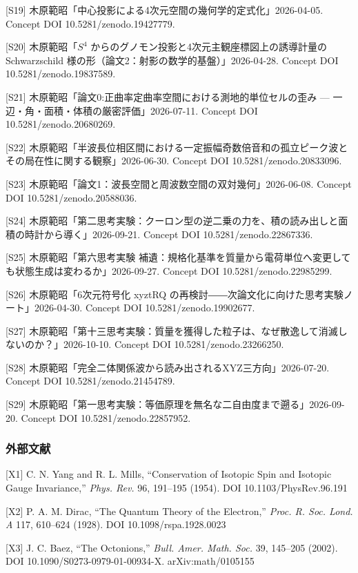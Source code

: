 \documentclass[
  a4paper,
]{ltjsarticle}
\begin{document}
{[}S19{]} 木原範昭「中心投影による4次元空間の幾何学的定式化」2026-04-05.
Concept DOI 10.5281/zenodo.19427779.

{[}S20{]} 木原範昭「\(S^4\)
からのグノモン投影と4次元主観座標図上の誘導計量の Schwarzschild
様の形（論文2：射影の数学的基盤）」2026-04-28. Concept DOI
10.5281/zenodo.19837589.

{[}S21{]} 木原範昭「論文0:正曲率定曲率空間における測地的単位セルの歪み
--- 一辺・角・面積・体積の厳密評価」2026-07-11. Concept DOI
10.5281/zenodo.20680269.

{[}S22{]}
木原範昭「半波長位相区間における一定振幅奇数倍音和の孤立ピーク波とその局在性に関する観察」2026-06-30.
Concept DOI 10.5281/zenodo.20833096.

{[}S23{]} 木原範昭「論文1：波長空間と周波数空間の双対幾何」2026-06-08.
Concept DOI 10.5281/zenodo.20588036.

{[}S24{]}
木原範昭「第二思考実験：クーロン型の逆二乗の力を、積の読み出しと面積の時計から導く」2026-09-21.
Concept DOI 10.5281/zenodo.22867336.

{[}S25{]} 木原範昭「第六思考実験
補遺：規格化基準を質量から電荷単位へ変更しても状態生成は変わるか」2026-09-27.
Concept DOI 10.5281/zenodo.22985299.

{[}S26{]} 木原範昭「6次元符号化 xyztRQ
の再検討――次論文化に向けた思考実験ノート」2026-04-30. Concept DOI
10.5281/zenodo.19902677.

{[}S27{]}
木原範昭「第十三思考実験：質量を獲得した粒子は、なぜ散逸して消滅しないのか？」2026-10-10.
Concept DOI 10.5281/zenodo.23266250.

{[}S28{]} 木原範昭「完全二体関係波から読み出されるXYZ三方向」2026-07-20.
Concept DOI 10.5281/zenodo.21454789.

{[}S29{]}
木原範昭「第一思考実験：等価原理を無名な二自由度まで遡る」2026-09-20.
Concept DOI 10.5281/zenodo.22857952.

\subsubsection{外部文献}\label{ux5916ux90e8ux6587ux732e}

{[}X1{]} C. N. Yang and R. L. Mills, ``Conservation of Isotopic Spin and
Isotopic Gauge Invariance,'' \emph{Phys. Rev.} 96, 191--195 (1954). DOI
10.1103/PhysRev.96.191

{[}X2{]} P. A. M. Dirac, ``The Quantum Theory of the Electron,''
\emph{Proc. R. Soc. Lond. A} 117, 610--624 (1928). DOI
10.1098/rspa.1928.0023

{[}X3{]} J. C. Baez, ``The Octonions,'' \emph{Bull. Amer. Math. Soc.}
39, 145--205 (2002). DOI 10.1090/S0273-0979-01-00934-X.
arXiv:math/0105155
\end{document}
